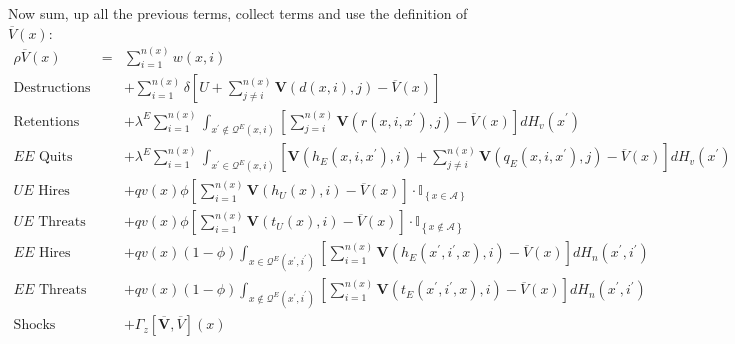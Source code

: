 Now sum, up all the previous terms, collect terms and use the definition of $%
\overline{V}\left( x\right) $:
\begin{eqnarray*}
\rho \overline{V}\left( x\right) &=&\sum\limits_{i=1}^{n\left( x\right) }w\left(
x,i\right) \\
\text{Destructions} &&+\sum\limits_{i=1}^{n\left( x\right) }\delta \left[
U+\sum_{j\neq i}^{n\left( x\right) }\boldsymbol{V}\left( d(x,i),j\right) -\overline{V}%
\left( x\right) \right] \\
\text{Retentions} &&+\lambda ^{E}\sum\limits_{i=1}^{n\left( x\right)
}\int_{x^{\prime }\notin \mathcal{Q}^{E}\left( x,i\right) }\left[
\sum_{j=i}^{n\left( x\right) }\boldsymbol{V}\left( r\left( x,i,x^{\prime
}\right) ,j\right) -\overline{V}\left( x\right) \right] dH_v\left( x^{\prime
}\right) \\
\text{$EE$ Quits} &&+\lambda ^{E}\sum\limits_{i=1}^{n\left( x\right)
}\int_{x^{\prime }\in \mathcal{Q}^{E}\left( x,i\right) }\left[ \boldsymbol{V}%
\left( h_{E}\left( x,i,x^{\prime }\right) ,i\right) +\sum_{j\neq i}^{n\left(
x\right) }\boldsymbol{V}\left( q_{E}\left( x,i,x^{\prime }\right) ,j\right) -%
\overline{V}\left( x\right) \right] dH_v\left( x^{\prime }\right) \\
\text{$UE$ Hires} &&+qv\left( x\right) \phi \left[ \sum\limits_{i=1}^{n%
\left( x\right) }\boldsymbol{V}\left( h_{U}\left( x\right) ,i\right) -\overline{V}%
\left( x\right) \right] \cdot \mathbb{I}_{\left\{ x\in \mathcal{A}\right\} }
\\
\text{$UE$ Threats} &&+qv\left( x\right) \phi \left[ \sum\limits_{i=1}^{n%
\left( x\right) }\boldsymbol{V}\left( t_{U}\left( x\right) ,i\right) -\overline{V}%
\left( x\right) \right] \cdot \mathbb{I}_{\left\{ x\notin \mathcal{A}%
\right\} } \\
\text{$EE$ Hires} &&+qv\left( x\right) \left( 1-\phi \right) \int_{x\in
\mathcal{Q}^{E}\left( x^{\prime },i^{\prime }\right) }\left[
\sum\limits_{i=1}^{n\left( x\right) }\boldsymbol{V}\left( h_{E}\left( x^{\prime
},i^{\prime },x\right) ,i\right) -\overline{V}\left( x\right) \right] dH_n\left(
x^{\prime },i^{\prime }\right) \\
\text{$EE$ Threats} &&+qv\left( x\right) \left( 1-\phi \right) \int_{x\notin
\mathcal{Q}^{E}\left( x^{\prime },i^{\prime }\right) }\left[
\sum\limits_{i=1}^{n\left( x\right) }\boldsymbol{V}\left( t_{E}\left( x^{\prime
},i^{\prime },x\right) ,i\right) -\overline{V}\left( x\right) \right] dH_n\left(
x^{\prime },i^{\prime }\right) \\
\text{Shocks} &&+\Gamma_z[\boldsymbol{\overline{V}},\overline{V}](x)
\end{eqnarray*}
